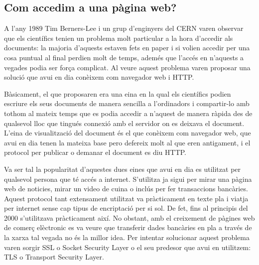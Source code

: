 \subsection{Com accedim a una pàgina web?}
{
    A l'any 1989 Tim Berners-Lee i un grup d'enginyers del \ac{CERN} varen observar que els científics tenien un problema molt particular a la hora d'accedir
    als documents: la majoria d'aquests estaven fets en paper i si volien accedir per una cosa puntual al final perdien molt de temps, ademés que l'accés 
    en n'aquests a vegades podia ser força complicat. Al veure aquest problema varen proposar una solució que avui en dia conèixem com navegador web i HTTP.

    Bàsicament, el que proposaren era una eina en la qual els científics podien escriure els seus documents de manera sencilla a l'ordinadors i compartir-lo
    amb tothom al mateix temps que es podia accedir a n'aquest de manera ràpida des de qualsevol lloc que tingués connexió amb el servidor on es deixava el 
    document. L'eina de visualització del document és el que conèixem com navegador web, que avui en dia tenen la mateixa base pero defereix molt al que eren
    antigament, i el protocol per publicar o demanar el document es diu HTTP.

    Va ser tal la popularitat d'aquestes dues eines que avui en dia es utilitzat per qualsevol persona que té accés a internet. S'utilitza
    ja sigui per mirar una pàgina web de noticies, mirar un video de cuina o inclús per fer transaccions bancàries. Aquest protocol tant extensament utilitzat 
    va pràcticament en texte pla i viatja per internet sense cap tipus de encriptació per si sol.  De fet, fins al principis del 2000 s'utilitzava pràcticament
    així. No obstant, amb el creixement de pàgines web de comerç elèctronic es va veure que transferir dades bancàries en pla a través de la xarxa tal vegada no 
    és la millor idea. Per intentar solucionar aquest problema varen sorgir \ac{SSL} o Socket Security Layer o el seu predesor que avui en utilitzem: TLS o Transport
    Security Layer.
}

